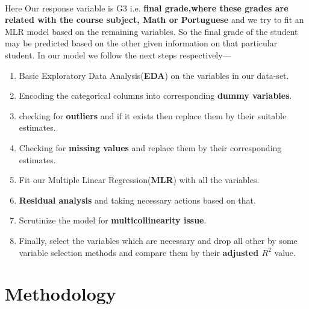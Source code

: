 \documentclass[A4paper,11pt]{report}
\begin{document}
	\paragraph{} Here Our response variable is G3 i.e. \textbf{final grade,where these grades are related with the course subject, Math or Portuguese} and we try to fit an MLR model based on the remaining variables. So the final grade of the student may be predicted based on the other given information on that particular student. In our model we follow the next steps respectively—
	\begin{enumerate}
		\vspace{0 cm}\item Basic Exploratory Data Analysis(\textbf{EDA}) on the variables in our data-set.\\
		\vspace{-0.5 cm}\item Encoding the categorical columns into corresponding \textbf{dummy variables}.\\
		\vspace{-0.5cm}\item checking for \textbf{outliers} and if it exists then replace them by their suitable estimates.\\
		\vspace{-0.5cm}\item Checking for \textbf{missing values} and replace them by their corresponding estimates. \\
		\vspace{-0.5cm}\item Fit our Multiple Linear Regression(\textbf{MLR}) with all the variables.
		\vspace{0 cm}\item \textbf{Residual analysis} and taking necessary actions based on that.
		\vspace{0 cm}\item Scrutinize the model for \textbf{multicollinearity issue}.\\
		\vspace{-0.5cm}\item Finally, select the variables which are necessary and drop all other by some variable selection methods and compare them by their \textbf{adjusted $R^2$} value.	
	\end{enumerate}

	\section{Methodology}
\end{document}
